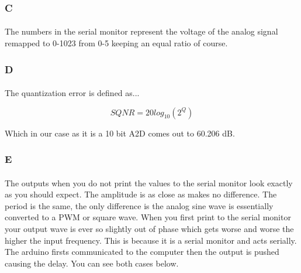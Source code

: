 \documentclass[12pt]{article}
\begin{document}
			\subsubsection{C}
				\paragraph{}
					The numbers in the serial monitor represent the voltage of the analog signal remapped to 0-1023 from 0-5 keeping an equal ratio of course.

			\subsubsection{D}
				\paragraph{}
					The quantization error is defined as...
						
					\begin{equation}
						SQNR = 20log_{10}(2^Q)
					\end{equation}

					Which in our case as it is a 10 bit A2D comes out to 60.206 dB.

			\subsubsection{E}
				\paragraph{}
					The outputs when you do not print the values to the serial monitor look exactly as you should expect.  The amplitude is as close as makes no
					difference.  The period is the same, the only difference is the analog sine wave is essentially converted to a PWM or square wave.  When you 
					first print to the serial monitor your output wave is ever so slightly out of phase which gets worse and worse the higher the input frequency.  This 
					is because it is a serial monitor and acts serially.  The arduino firsts communicated to the computer then the output is pushed causing the delay.  
					You can see both cases below.
\end{document}
